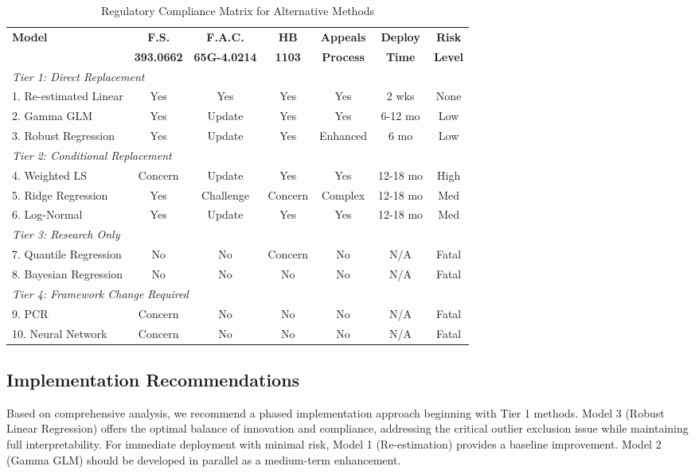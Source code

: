 \begin{table}[h]
\centering
\caption{Regulatory Compliance Matrix for Alternative Methods}
\label{tab:compliance}
\begin{tabular}{lcccccc}
\hline
\textbf{Model} & \textbf{F.S.} & \textbf{F.A.C.} & \textbf{HB} & \textbf{Appeals} & \textbf{Deploy} & \textbf{Risk} \\
 & \textbf{393.0662} & \textbf{65G-4.0214} & \textbf{1103} & \textbf{Process} & \textbf{Time} & \textbf{Level} \\
\hline
\multicolumn{7}{l}{\textit{Tier 1: Direct Replacement}} \\
1. Re-estimated Linear & Yes & Yes & Yes & Yes & 2 wks & None \\
2. Gamma GLM & Yes & Update & Yes & Yes & 6-12 mo & Low \\
3. Robust Regression & Yes & Update & Yes & Enhanced & 6 mo & Low \\
\hline
\multicolumn{7}{l}{\textit{Tier 2: Conditional Replacement}} \\
4. Weighted LS & Concern & Update & Yes & Yes & 12-18 mo & High \\
5. Ridge Regression & Yes & Challenge & Concern & Complex & 12-18 mo & Med \\
6. Log-Normal & Yes & Update & Yes & Yes & 12-18 mo & Med \\
\hline
\multicolumn{7}{l}{\textit{Tier 3: Research Only}} \\
7. Quantile Regression & No & No & Concern & No & N/A & Fatal \\
8. Bayesian Regression & No & No & No & No & N/A & Fatal \\
\hline
\multicolumn{7}{l}{\textit{Tier 4: Framework Change Required}} \\
9. PCR & Concern & No & No & No & N/A & Fatal \\
10. Neural Network & Concern & No & No & No & N/A & Fatal \\
\hline
\end{tabular}
\end{table}

\subsection{Implementation Recommendations}

Based on comprehensive analysis, we recommend a phased implementation approach beginning with Tier 1 methods. Model 3 (Robust Linear Regression) offers the optimal balance of innovation and compliance, addressing the critical outlier exclusion issue while maintaining full interpretability. For immediate deployment with minimal risk, Model 1 (Re-estimation) provides a baseline improvement. Model 2 (Gamma GLM) should be developed in parallel as a medium-term enhancement.

